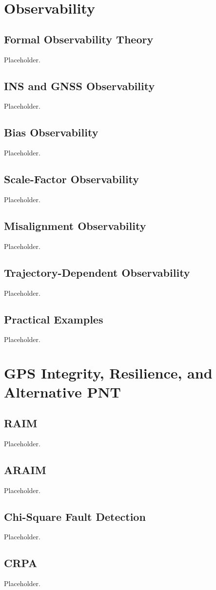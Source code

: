 \documentclass[11pt,oneside]{book}
\begin{document}
\chapter{Observability}
\section{Formal Observability Theory}
Placeholder.
\section{INS and GNSS Observability}
Placeholder.
\section{Bias Observability}
Placeholder.
\section{Scale-Factor Observability}
Placeholder.
\section{Misalignment Observability}
Placeholder.
\section{Trajectory-Dependent Observability}
Placeholder.
\section{Practical Examples}
Placeholder.

\chapter{GPS Integrity, Resilience, and Alternative PNT}
\section{RAIM}
Placeholder.
\section{ARAIM}
Placeholder.
\section{Chi-Square Fault Detection}
Placeholder.
\section{CRPA}
Placeholder.
\end{document}
